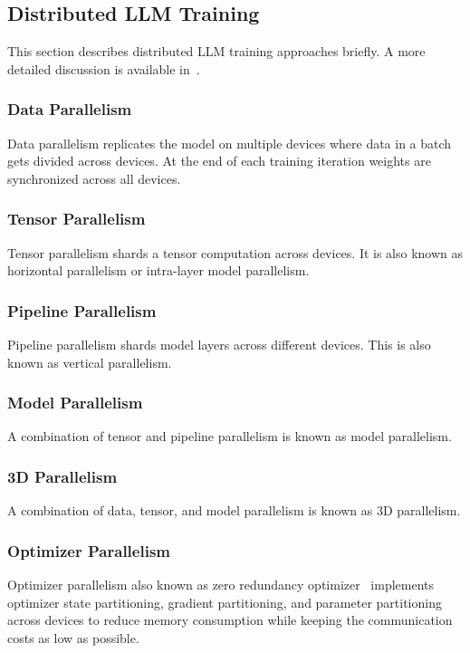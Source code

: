 \subsection{Distributed LLM Training}
This section describes distributed LLM training approaches briefly. A more detailed discussion is available in~\cite{Survey_LLM}. 

\subsubsection{Data Parallelism}
Data parallelism replicates the model on multiple devices where data in a batch gets divided across devices. At the end of each training iteration weights are synchronized across all devices.    

\subsubsection{Tensor Parallelism}
Tensor parallelism shards a tensor computation across devices. It is also known as horizontal parallelism or intra-layer model parallelism.

\subsubsection{Pipeline Parallelism}
Pipeline parallelism shards model layers across different devices. This is also known as vertical parallelism.

\subsubsection{Model Parallelism}
A combination of tensor and pipeline parallelism is known as model parallelism.
\subsubsection{3D Parallelism}
A combination of data, tensor, and model parallelism is known as 3D parallelism.

\subsubsection{Optimizer Parallelism}
Optimizer parallelism also known as zero redundancy optimizer~\cite{ZeroOpt} implements optimizer state partitioning, gradient partitioning, and parameter partitioning across devices to reduce memory consumption while keeping the communication costs as low as possible. 

